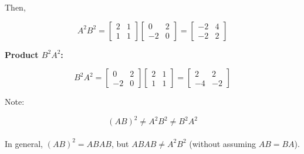 \begin{answer}
    Then,

    $$
        A^2B^2 = \begin{bmatrix}
            2 & 1 \\
            1 & 1
        \end{bmatrix}
        \begin{bmatrix}
            0 & 2 \\
            -2 & 0
        \end{bmatrix} = \boxed{\begin{bmatrix}
            -2 & 4 \\
            -2 & 2
        \end{bmatrix}}
    $$

    \textbf{Product $B^2A^2$:}

    $$
        B^2A^2 = \begin{bmatrix}
            0 & 2 \\
            -2 & 0
        \end{bmatrix}
        \begin{bmatrix}
            2 & 1 \\
            1 & 1
        \end{bmatrix} = \boxed{\begin{bmatrix}
            2 & 2 \\
            -4 & -2
        \end{bmatrix}}
    $$

    Note:

    $$
    \boxed{
        (AB)^2 \neq A^2B^2 \neq B^2A^2
    }
    $$\\

    In general, $(AB)^2 = ABAB$, but $ABAB \neq A^2B^2$
    (without assuming $AB=BA$).
\end{answer}
